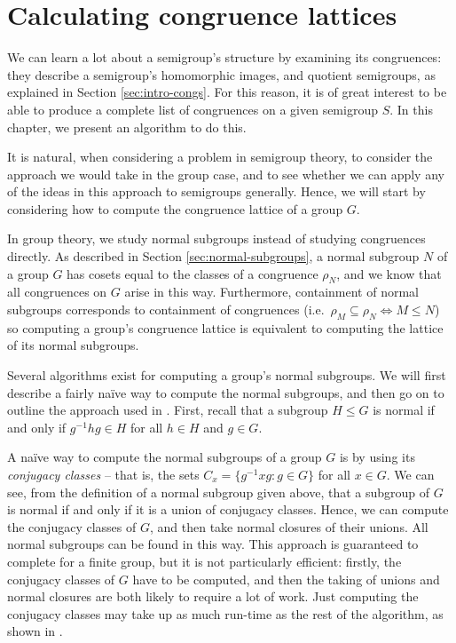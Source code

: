 \chapter{Calculating congruence lattices}
\label{chap:lattice}

We can learn a lot about a semigroup's structure by examining its congruences:
they describe a semigroup's homomorphic images, and quotient semigroups, as
explained in Section \ref{sec:intro-congs}.  For this reason, it is of great
interest to be able to produce a complete list of congruences on a given
semigroup $S$.  In this chapter, we present an algorithm to do this.

It is natural, when considering a problem in semigroup theory, to consider the
approach we would take in the group case, and to see whether we can apply any of
the ideas in this approach to semigroups generally.  Hence, we will start by
considering how to compute the congruence lattice of a group $G$.

In group theory, we study normal subgroups instead of studying congruences
directly.  As described in Section \ref{sec:normal-subgroups}, a normal subgroup
$N$ of a group $G$ has cosets equal to the classes of a congruence $\rho_N$, and
we know that all congruences on $G$ arise in this way.  Furthermore, containment
of normal subgroups corresponds to containment of congruences
(i.e.~$\rho_M \subseteq \rho_N \iff M \leq N$) so computing a group's congruence
lattice is equivalent to computing the lattice of its normal subgroups.

Several algorithms exist for computing a group's normal subgroups.  We will
first describe a fairly na\"ive way to compute the normal subgroups, and then go
on to outline the approach used in \GAP{}.  First, recall that a subgroup
$H \leq G$ is normal if and only if $g^{-1}hg \in H$ for all $h \in H$ and
$g \in G$.

 A na\"ive way to compute the normal subgroups of a group
$G$ is by using its \textit{conjugacy classes} -- that is, the sets
$C_x = \{g^{-1}xg : g \in G\}$ for all $x \in G$.  We can see, from the
definition of a normal subgroup given above, that a subgroup of $G$ is normal if
and only if it is a union of conjugacy classes.  Hence, we can compute the
conjugacy classes of $G$, and then take normal closures of their unions.  All
normal subgroups can be found in this way.  This approach is guaranteed to
complete for a finite group, but it is not particularly efficient: firstly, the
conjugacy classes of $G$ have to be computed, and then the taking of unions and
normal closures are both likely to require a lot of work.  Just computing the
conjugacy classes may take up as much run-time as the rest of the algorithm, as
shown in \cite[Table 1]{hulpke_1998}.

